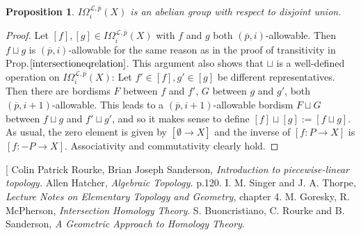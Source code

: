 \documentclass{scrreprt}
\newtheorem{prop}{Proposition}[chapter]
\begin{document}
\begin{prop}
$I \Omega_i^{\mathcal{L}, \overline{p}}(X) $ is an abelian group with respect to disjoint union.
\end{prop}

\begin{proof}
Let $[f],[g] \in I \Omega_i^{\mathcal{L}, \overline{p}}(X) $ with $f$ and $g$ both $(\overline{p},i)$-allowable. Then $f \sqcup g$ is $(\overline{p},i)$-allowable for the same reason as in the proof of transitivity in Prop.$\ref{intersectioneqrelation}$. This argument also shows that $\sqcup$ is a well-defined operation on $I \Omega_i^{\mathcal{L}, \overline{p}}(X)$: Let $f' \in [f],g' \in [g]$ be different representatives. Then there are bordisms $F$ between $f$ and $f'$, $G$ between $g$ and $g'$, both $(\overline{p},i+1)$-allowable. This leads to a $(\overline{p},i+1)$-allowable bordism $F \sqcup G$ between $f \sqcup g$ and $f' \sqcup g'$, and so it makes sense to define $[f] \sqcup [g]:=[f \sqcup g]$. As usual, the zero element is given by $[\emptyset \to X]$ and the inverse of $[f: P \to X]$ is $[f: -P \to X]$. Associativity and commutativity clearly hold.
\end{proof}

\begin{thebibliography}[
Colin Patrick Rourke, Brian Joseph Sanderson, \textit{Introduction to piecewise-linear topology.}
Allen Hatcher, \textit{Algebraic Topology.} p.120.
I. M. Singer and J. A. Thorpe, \textit{Lecture Notes on Elementary Topology and Geometry}, chapter 4.
M. Goresky, R. McPherson, \textit{Intersection Homology Theory}.
S. Buoncristiano, C. Rourke and B. Sanderson, \textit{A Geometric Approach to Homology Theory}.
\end{thebibliography}
\end{document}
